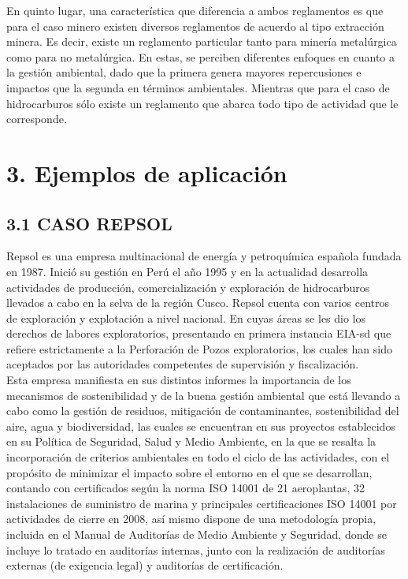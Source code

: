 \documentclass[12pt, a4paper]{article} %
\begin{document}
        \begin{multicols}{2}
        En quinto lugar, una característica que diferencia a ambos reglamentos es que para el caso minero existen diversos reglamentos de acuerdo al tipo extracción minera. Es decir, existe un reglamento particular tanto para minería metalúrgica como para no metalúrgica. En estas, se perciben diferentes enfoques en cuanto a la gestión ambiental, dado que la primera genera mayores repercusiones e impactos que la segunda en términos ambientales. Mientras que para el caso de hidrocarburos sólo existe un reglamento que abarca todo tipo de actividad que le corresponde. 
        
        \section*{3. Ejemplos de aplicación}
            \subsection*{3.1 CASO REPSOL}
            Repsol es una empresa multinacional de energía y petroquímica española fundada en 1987. Inició su gestión en Perú el año 1995 y en la actualidad desarrolla actividades de producción, comercialización y exploración de hidrocarburos llevados a cabo en la selva de la región Cusco. Repsol cuenta con varios centros de exploración y explotación a nivel nacional. En cuyas áreas se les dio los derechos de labores exploratorios, presentando en primera instancia EIA-sd que refiere estrictamente a la Perforación de Pozos exploratorios, los cuales han sido aceptados por las autoridades competentes de supervisión y fiscalización. \\
            Esta empresa manifiesta en sus distintos informes la importancia de los mecanismos de sostenibilidad y de la buena gestión ambiental que está llevando a cabo como la gestión de residuos, mitigación de contaminantes, sostenibilidad del aire, agua y biodiversidad, las cuales se encuentran en sus proyectos establecidos en su Política de Seguridad, Salud y Medio Ambiente, en la que se resalta la incorporación de criterios ambientales en todo el ciclo de las actividades, con el propósito de minimizar el impacto sobre el entorno en el que se desarrollan, contando con certificados según la norma ISO 14001 de 21 aeroplantas, 32 instalaciones de suministro de marina y principales certificaciones ISO 14001 por actividades de cierre en  2008, así mismo dispone de una metodología propia, incluida en el Manual de Auditorías de Medio Ambiente y Seguridad, donde se incluye lo tratado en auditorías internas, junto con la realización de auditorías externas (de exigencia legal) y auditorías de certificación.
            \end{multicols}
            
\end{document}
